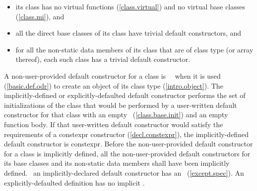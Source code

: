 \documentclass[american]{book}
\begin{document}
\begin{paras}
\begin{itemize}
\item
its class has no virtual functions (\ref{class.virtual}) and no virtual base
classes (\ref{class.mi}), and
\item
all the direct base classes of its class have trivial default constructors, and
\item
for all the non-static data members of its class that are of class
type (or array thereof), each such class has a trivial default constructor.
\end{itemize}
\begin{itemize}
\end{itemize}

\setcounter{Paras}{6}
\pnum
A non-user-provided default constructor for a class is
\ 
\ 
when it is used (\ref{basic.def.odr})
to create an object of its class type (\ref{intro.object}).
The implicitly-defined or explicitly-defaulted default constructor
performs the set of
initializations of the class that would be performed by a
user-written default constructor for that class with an empty
\techterm{mem-initializer-list}\ 
(\ref{class.base.init}) and an empty function
body.
If that 
user-written default constructor would satisfy the requirements of a
constexpr constructor (\ref{decl.constexpr}), the implicitly-defined  
default constructor is constexpr. 
Before the non-user-provided default constructor for a class is
implicitly defined,
all the non-user-provided default constructors for its base classes and
its non-static data members shall have been implicitly defined.
\enternote\ 
an implicitly-declared default constructor has an
~(\ref{except.spec}).
An explicitly-defaulted definition has no implicit
\techterm{exception-specification}.
\exitnote\ 


\end{paras}
\end{document}
